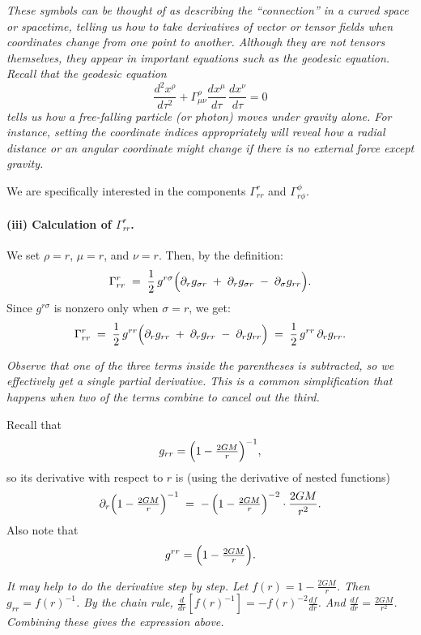 \documentclass{article}
\begin{document}
\emph{These symbols can be thought of as describing the ``connection'' in a curved space or spacetime, telling us how to take derivatives of vector or tensor fields when coordinates change from one point to another. Although they are not tensors themselves, they appear in important equations such as the geodesic equation. Recall that the geodesic equation}
\[
\frac{d^2 x^\rho}{d\tau^2}
+
\Gamma^\rho_{\mu\nu}
\frac{dx^\mu}{d\tau}\,\frac{dx^\nu}{d\tau}
= 0
\]
\emph{tells us how a free-falling particle (or photon) moves under gravity alone. For instance, setting the coordinate indices appropriately will reveal how a radial distance or an angular coordinate might change if there is no external force except gravity.}

\noindent
We are specifically interested in the components \(\Gamma^r_{rr}\) and \(\Gamma^\phi_{r\phi}\).

\paragraph{(iii) Calculation of \(\Gamma^r_{rr}\).}
We set \(\rho = r\), \(\mu = r\), and \(\nu = r\). Then, by the definition:
\[
\Gamma^r_{rr}
\;=\;
\frac{1}{2}\,g^{r\sigma}
\Bigl(
\partial_r g_{\sigma r}
\;+\;
\partial_r g_{\sigma r}
\;-\;
\partial_\sigma g_{rr}
\Bigr).
\]
Since \(g^{r\sigma}\) is nonzero only when \(\sigma = r\), we get:
\[
\Gamma^r_{rr}
\;=\;
\frac{1}{2}\, g^{rr}
\Bigl(
\partial_r g_{rr}
\;+\;
\partial_r g_{rr}
\;-\;
\partial_r g_{rr}
\Bigr)
\;=\;
\frac{1}{2}\, g^{rr} \,\partial_r g_{rr}.
\]

\emph{Observe that one of the three terms inside the parentheses is subtracted, so we effectively get a single partial derivative. This is a common simplification that happens when two of the terms combine to cancel out the third.}

\smallskip

\noindent
Recall that
\[
g_{rr}
=
\Bigl(1 - \tfrac{2GM}{r}\Bigr)^{-1},
\]
so its derivative with respect to \(r\) is (using the derivative of nested functions)
\[
\partial_r \Bigl(1 - \tfrac{2GM}{r}\Bigr)^{-1}
\;=\;
-\,\Bigl(1 - \tfrac{2GM}{r}\Bigr)^{-2}
\cdot
\frac{2GM}{r^2}.
\]
Also note that
\[
g^{rr}
=
\Bigl(1 - \tfrac{2GM}{r}\Bigr).
\]

\emph{It may help to do the derivative step by step. Let \(f(r) = 1 - \tfrac{2GM}{r}\). Then \(g_{rr} = f(r)^{-1}\). By the chain rule, \(\tfrac{d}{dr}[f(r)^{-1}] = -f(r)^{-2} \tfrac{df}{dr}\). And \(\tfrac{df}{dr} = \tfrac{2GM}{r^2}\). Combining these gives the expression above.}
\end{document}
